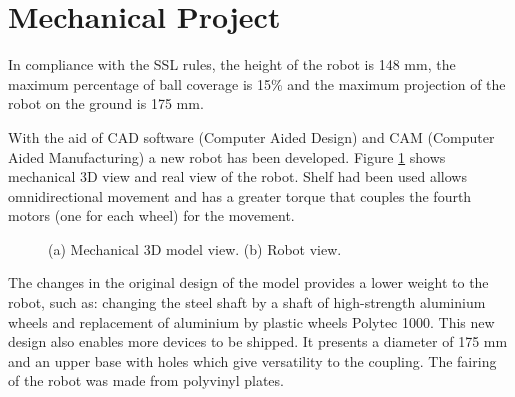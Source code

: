\section{Mechanical Project}

In compliance with the SSL rules, the height of the robot is 148 mm, the maximum
percentage of ball coverage is 15\% and the maximum projection of the robot on the ground is 175 mm.

With the aid of CAD software (Computer Aided Design) and CAM (Computer Aided
Manufacturing) a new robot has been developed. Figure \ref{mec} shows mechanical
3D view and real view of the robot. Shelf had been used allows omnidirectional
movement and has a greater torque that couples the fourth motors (one for each
wheel) for the movement.

\begin{figure}[thpb]
	\centering
	\caption{(a) Mechanical 3D model view. (b) Robot view.}
	\label{mec}
\end{figure}

The changes in the original design of the model provides a lower weight to
the robot, such as: changing the steel shaft by a shaft of high-strength
aluminium wheels and replacement of aluminium by plastic wheels Polytec
1000. This new design also enables more devices to be shipped. It presents
a diameter of 175 mm and an upper base with holes which give versatility
to the coupling. The fairing of the robot was made from polyvinyl plates.

